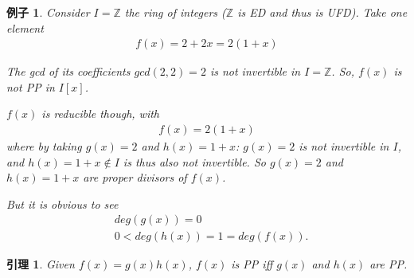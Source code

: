 \documentclass[utf8]{ctexbook}
\newtheorem{example}{例子}[section]
\newtheorem{lemma}{引理}[section]
\begin{document}
\begin{example}
Consider $I = \mathbb{Z}$ the ring of integers ($\mathbb{Z}$ is ED and thus is UFD). Take one element
\begin{align*}
f(x) = 2 + 2x = 2(1+x)
\end{align*}

The gcd of its coefficients $gcd(2,2) = 2$ is not invertible in $I = \mathbb{Z}$. So, $f(x)$ is not PP in $I[x]$. 

$f(x)$ is reducible though, with
\begin{align*}
f(x) = 2 (1+x)
\end{align*}
where by taking $g(x)=2$ and $h(x)=1+x$: $g(x)=2$ is not invertible in $I$, and $h(x) = 1+x \not \in I$ is thus also not invertible. So $g(x) = 2$ and $h(x) = 1+x$ are proper divisors of $f(x)$.

But it is obvious to see
\begin{align*}
& deg(g(x)) = 0 \\
& 0< deg(h(x)) = 1 = deg(f(x)) .
\end{align*}


\end{example}



\begin{lemma}\label{lemma_Factor_poly_ring_1}
Given $f(x) = g(x) h(x)$, $f(x)$ is PP iff $g(x)$ and $h(x)$ are PP. 
\end{lemma}
\end{document}

